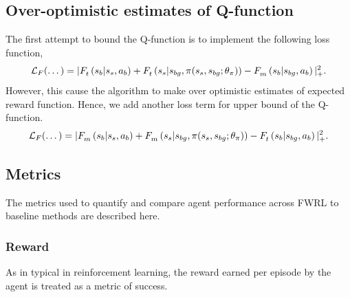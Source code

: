 \subsection{Over-optimistic estimates of Q-function}
The first attempt to bound the Q-function is to implement the following loss
function,
%
\begin{align}
    \Loss_\fw(\dots) = |
      \fwargs{\state_{s}}{\act_b}{\state_b}{t}{}
      + \fwargs{\state_{bg}}{\policy(\state_s, \state_{bg};\param_\policy)}{\state_s}{t}{}
      - \fwargs{\state_{bg}}{\act_b}{\state_b}{m}{}
      |_+^2.
\end{align}%
% 
However, this cause the algorithm to make over optimistic estimates of expected
reward function. Hence, we add another loss term for upper bound of the Q-function.
%
\begin{align}
    \Loss_\fw(\dots) = |
      \fwargs{\state_{s}}{\act_b}{\state_b}{m}{}
      + \fwargs{\state_{bg}}{\policy(\state_s, \state_{bg};\param_\policy)}{\state_s}{m}{}
      - \fwargs{\state_{bg}}{\act_b}{\state_b}{t}{}
      |_+^2.
\end{align}%
% 

\subsection{Metrics}
The metrics used to quantify and compare agent performance across
FWRL to baseline methods are described here.

\subsubsection{Reward}
As in typical in reinforcement learning, the reward earned per episode by the
agent is treated as a metric of success.



